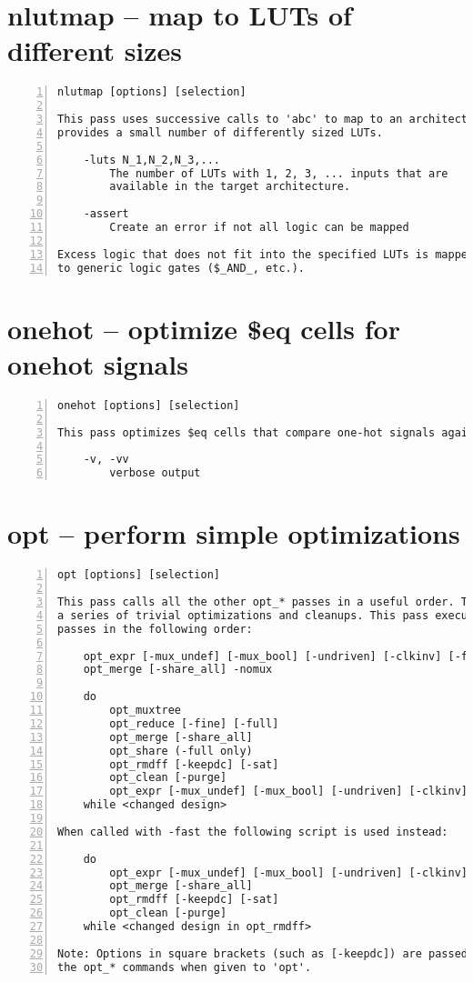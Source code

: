 \section{nlutmap -- map to LUTs of different sizes}
\label{cmd:nlutmap}
\begin{lstlisting}[numbers=left,frame=single]
    nlutmap [options] [selection]

This pass uses successive calls to 'abc' to map to an architecture. That
provides a small number of differently sized LUTs.

    -luts N_1,N_2,N_3,...
        The number of LUTs with 1, 2, 3, ... inputs that are
        available in the target architecture.

    -assert
        Create an error if not all logic can be mapped

Excess logic that does not fit into the specified LUTs is mapped back
to generic logic gates ($_AND_, etc.).
\end{lstlisting}

\section{onehot -- optimize \$eq cells for onehot signals}
\label{cmd:onehot}
\begin{lstlisting}[numbers=left,frame=single]
    onehot [options] [selection]

This pass optimizes $eq cells that compare one-hot signals against constants

    -v, -vv
        verbose output
\end{lstlisting}

\section{opt -- perform simple optimizations}
\label{cmd:opt}
\begin{lstlisting}[numbers=left,frame=single]
    opt [options] [selection]

This pass calls all the other opt_* passes in a useful order. This performs
a series of trivial optimizations and cleanups. This pass executes the other
passes in the following order:

    opt_expr [-mux_undef] [-mux_bool] [-undriven] [-clkinv] [-fine] [-full] [-keepdc]
    opt_merge [-share_all] -nomux

    do
        opt_muxtree
        opt_reduce [-fine] [-full]
        opt_merge [-share_all]
        opt_share (-full only)
        opt_rmdff [-keepdc] [-sat]
        opt_clean [-purge]
        opt_expr [-mux_undef] [-mux_bool] [-undriven] [-clkinv] [-fine] [-full] [-keepdc]
    while <changed design>

When called with -fast the following script is used instead:

    do
        opt_expr [-mux_undef] [-mux_bool] [-undriven] [-clkinv] [-fine] [-full] [-keepdc]
        opt_merge [-share_all]
        opt_rmdff [-keepdc] [-sat]
        opt_clean [-purge]
    while <changed design in opt_rmdff>

Note: Options in square brackets (such as [-keepdc]) are passed through to
the opt_* commands when given to 'opt'.
\end{lstlisting}


